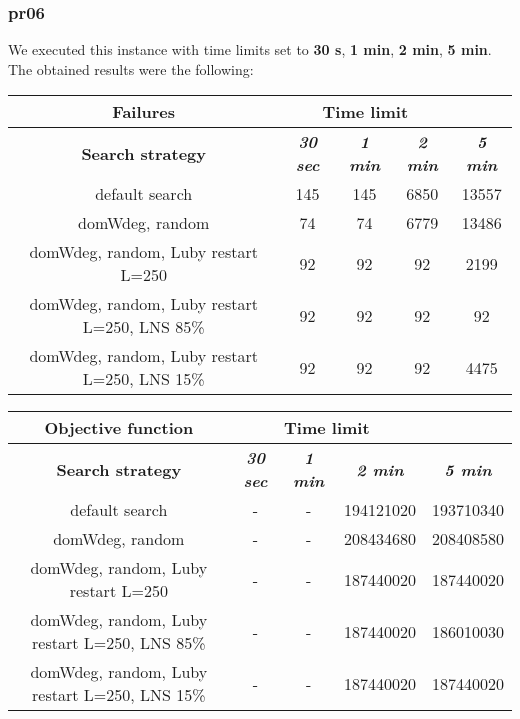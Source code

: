\subsubsection{pr06}
We executed this instance with time limits set to \textbf{30 s}, \textbf{1 min}, \textbf{2 min}, \textbf{5 min}.\\
The obtained results were the following:
{
\renewcommand{\arraystretch}{2}
\begin{longtable}[h]{| c | c | c | c | c |}
    \hline
    \textbf{Failures} & \multicolumn{3}{c}{Time limit} & \\
    \hline
    \textbf{Search strategy} & \textbf{\textit{30 sec}} & \textbf{\textit{1 min}} & \textbf{\textit{2 min}} & \textbf{\textit{5 min}} \\
    \hline
    \endhead
    default search                                & 145 &  145 &  6850 &  13557 \\
    \hline
    domWdeg, random                               &  74 &   74 &  6779 &  13486 \\
    \hline
    domWdeg, random, Luby restart L=250           &  92 &   92 &   92 &    2199 \\
    \hline
    domWdeg, random, Luby restart L=250, LNS 85\% &  92 &   92 &   92 &      92 \\
    \hline
    domWdeg, random, Luby restart L=250, LNS 15\% &  92 &   92 &   92 &    4475 \\
    \hline
\end{longtable}
}

{
\renewcommand{\arraystretch}{2}
\begin{longtable}[h]{| c | c | c | c | c |}
    \hline
    \textbf{Objective function} & \multicolumn{3}{c}{Time limit} & \\
    \hline
    \textbf{Search strategy} & \textbf{\textit{30 sec}} & \textbf{\textit{1 min}} & \textbf{\textit{2 min}} & \textbf{\textit{5 min}} \\
    \hline
    \endhead
    default search                                & - & - & 194121020 & 193710340 \\
    \hline
    domWdeg, random                               & - & - & 208434680 & 208408580 \\
    \hline
    domWdeg, random, Luby restart L=250           & - & - & 187440020 & 187440020 \\
    \hline
    domWdeg, random, Luby restart L=250, LNS 85\% & - & - & 187440020 & 186010030 \\
    \hline
    domWdeg, random, Luby restart L=250, LNS 15\% & - & - & 187440020 & 187440020 \\
    \hline
\end{longtable}
}